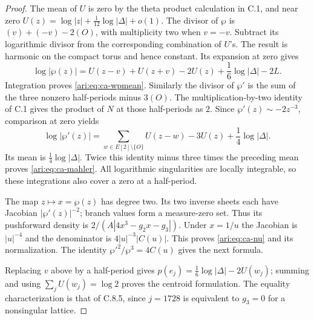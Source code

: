 \begin{proof}
The mean of $U$ is zero by the theta product calculation in C.1,
and near zero
$U(z)=\log|z|+\frac1{12}\log|\Delta|+o(1)$.
The divisor of $\wp$ is $(v)+(-v)-2(O)$, with multiplicity
two when $v=-v$. Subtract its logarithmic divisor from the
corresponding combination of $U$'s. The result is harmonic
on the compact torus and hence constant. Its expansion at
zero gives
\[
 \log|\wp(z)|=U(z-v)+U(z+v)-2U(z)
                  +\frac16\log|\Delta|-2L.
\]
Integration proves \eqref{ari:eq:ca-wpmean}.
Similarly the divisor of $\wp'$ is the sum of the three
nonzero half-periods minus $3(O)$. The multiplication-by-two
identity of C.1 gives the product of $N$ at those half-periods
as $2$. Since $\wp'(z)\sim-2z^{-3}$, comparison at zero yields
\[
 \log|\wp'(z)|=\sum_{w\in E[2]\setminus\{O\}}U(z-w)-3U(z)
                         +\frac14\log|\Delta|.
\]
Its mean is $\frac14\log|\Delta|$. Twice this identity minus
three times the preceding mean proves \eqref{ari:eq:ca-mahler}.
All logarithmic singularities are locally integrable, so these
integrations also cover a zero at a half-period.

The map $z\mapsto x=\wp(z)$ has degree two. Its two inverse
sheets each have Jacobian $|\wp'(z)|^{-2}$; branch values form
a measure-zero set. Thus its pushforward density is
$2/(A|4x^3-g_2x-g_3|)$. Under $x=1/u$ the Jacobian is
$|u|^{-4}$ and the denominator is $4|u|^{-3}|C(u)|$.
This proves \eqref{ari:eq:ca-nu} and its normalization. The identity
$\wp'^2/\wp^3=4C(u)$ gives the next formula.

Replacing $v$ above by a half-period gives
$p(e_j)=\frac16\log|\Delta|-2U(w_j)$; summing and using
$\sum_jU(w_j)=\log2$ proves the centroid formulation.
The equality characterization is that of C.8.5,
since $j=1728$ is equivalent to $g_3=0$ for a nonsingular lattice.
\end{proof}


